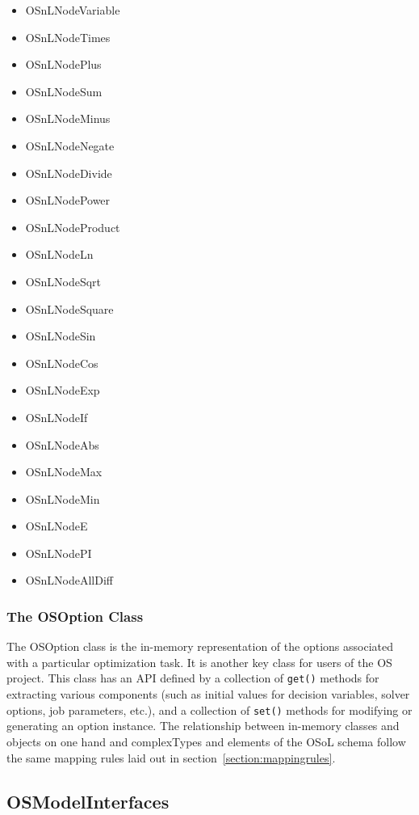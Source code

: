 \documentclass[11pt]{article}
\renewcommand{\_}{{\char"5F}}
\renewcommand{\{}{{\char"7B}}
\renewcommand{\}}{{\char"7D}}
\renewcommand{\^}{{\char"0D}}
\renewcommand{\'}{{\char"0D}}
\begin{document}
\begin{enumerate}[Step 1:]
\begin{itemize}
\item OSnLNodeVariable
\item OSnLNodeTimes
\item OSnLNodePlus
\item OSnLNodeSum
\item OSnLNodeMinus
\item OSnLNodeNegate
\item OSnLNodeDivide
\item OSnLNodePower
\item OSnLNodeProduct
\item OSnLNodeLn
\item OSnLNodeSqrt
\item OSnLNodeSquare
\item OSnLNodeSin
\item OSnLNodeCos
\item OSnLNodeExp
\item OSnLNodeIf
\item OSnLNodeAbs
\item OSnLNodeMax
\item OSnLNodeMin
\item OSnLNodeE
\item OSnLNodePI
\item OSnLNodeAllDiff
\end{itemize}



\subsubsection{The OSOption Class}\label{section:osoptionclass}

The OSOption class is the in-memory representation of the options associated with a
particular optimization task. It is another key
class for users of the OS project. This class has an API defined by a collection of {\tt get()} methods for
extracting various components (such as initial values for decision variables, solver options, job parameters, etc.), 
and a collection of {\tt set()} methods for modifying or generating an option instance. The relationship between
in-memory classes and objects on one hand and complexTypes and elements of the OSoL schema follow the same mapping rules
laid out in section~\ref{section:mappingrules}.

\subsection{OSModelInterfaces}\label{section:osmodelinterfaces}


\end{enumerate}
\end{document}
